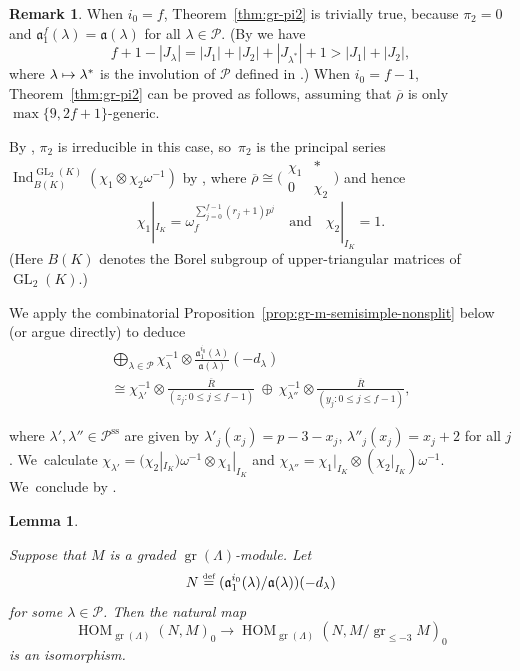 \documentclass[JEP,XML,SOM,Unicode,NoFloatCountersInSection, NoEqCountersInSection,published]{cedram}
\newcommand\mto{\mathchoice{\longmapsto}{\mapsto}{\mapsto}{\mapsto}}
\newcommand{\quand}{\quad\text{and}\quad}
\let\ovl\overline
\newcommand{\defeq}{\stackrel{\textrm{\tiny{\upshape{def}}}}{=}}
\renewcommand{\P}{\mathscr P}
\renewcommand{\ss}{\mathrm{ss}}
\newcommand{\brho}{\overline{\rho}}
\DeclareMathOperator{\GL}{GL}
\DeclareMathOperator{\gr}{gr}
\DeclareMathOperator{\HOM}{HOM}
\DeclareMathOperator{\Ind}{Ind}
\newcommand{\smatr}[4]{\bigl(\begin{smallmatrix} {#1}& {#2}\\ {#3}&{#4}\end{smallmatrix}\bigr)}
\theoremstyle{plain}
\newtheorem{lem}[prop]{Lemma}
\theoremstyle{definition}
\newtheorem{rem}[prop]{Remark}
\begin{document}
\begin{rem}\label{rem:i0-f-1-or-f}
When $i_0 = f$, Theorem~\ref{thm:gr-pi2} is trivially true, because $\pi_2 = 0$ and $\mathfrak{a}_1^{f}(\lambda) = \mathfrak{a}(\lambda)$ for all $\lambda \in \P$.
(By \cite[Lem.\,4.1.4]{BHHMS4} we have
\[
f+1-|J_\lambda| = |J_1|+|J_2|+|J_{\lambda^*}|+1 > |J_1|+|J_2|,
\]
where $\lambda\mto \lambda^*$ is the involution of $\mathscr{P}$ defined in \cite[Def.\,3.62]{BHHMS2}.)
When $i_0 = f-1$, Theorem~\ref{thm:gr-pi2} can be proved as follows, assuming that $\brho$ is only $\max\{9,2f+1\}$-generic.

By \cite[Th.\,4.4.8(ii)]{BHHMS4}, $\pi_2$ is irreducible in this case, so~$\pi_2$ is the principal series $\Ind_{B(K)}^{\GL_2(K)} (\chi_1 \otimes \chi_2\omega^{-1})$ by \cite[Prop.\,10.8]{HuWang2}, where $\ovl\rho \cong \smatr{\chi_1} * 0 {\chi_2}$ and hence
\[
\chi_1|_{I_K} = \omega_f^{\sum_{j=0}^{f-1} (r_j+1) p^j}\quand\chi_2|_{I_K} = 1.
\]
(Here $B(K)$ denotes the Borel subgroup of upper-triangular matrices of $\GL_2(K)$.)

\noindent
\begin{minipage}{\textwidth}\indent
We apply the combinatorial Proposition~\ref{prop:gr-m-semisimple-nonsplit} below (or argue directly) to deduce
\begin{multline}\label{eq:i0-f-1}
\bigoplus_{\lambda \in \P} \chi_\lambda^{-1} \otimes \frac{\mathfrak{a}_1^{i_0}(\lambda)}{\mathfrak{a}(\lambda)}(-d_\lambda)\\[-15pt]
\cong \chi_{\lambda'}^{-1} \!\otimes \!\frac{\ovl R}{(z_j: 0 \le j \le f-1)} \ \oplus \ \chi_{\lambda''}^{-1}\! \otimes \!\frac{\ovl R}{(y_j: 0 \le j \le f-1)},
\end{multline}
\end{minipage}
\par\vspace{6pt}\noindent
where $\lambda',\lambda'' \in \P^\ss$ are given by $\lambda'_j(x_j) = p-3-x_j$, $\lambda''_j(x_j) = x_j+2$ for all $j$. We~calculate $\chi_{\lambda'} = (\chi_2|_{I_K})\omega^{-1} \otimes \chi_1|_{I_K}$ and $\chi_{\lambda''} = \chi_1|_{I_K} \otimes (\chi_2|_{I_K})\omega^{-1}$. We~conclude by \cite[Prop.\,3.76(ii)]{BHHMS2}.
\end{rem}

\begin{lem}\label{lem:lift-graded-homo}

Suppose that $M$ is a graded $\gr(\Lambda)$-module.
Let
\[
N \defeq (\mathfrak{a}_1^{i_0}(\lambda)/\mathfrak{a}(\lambda))(-d_\lambda)
\]
for some $\lambda \in \P$.
Then the natural map
\begin{equation*}
\HOM_{\gr(\Lambda)}(N,M)_0 \to \HOM_{\gr(\Lambda)}(N,M/\gr_{\le-3} M)_0
\end{equation*}
is an isomorphism.
\end{lem}
\end{document}
